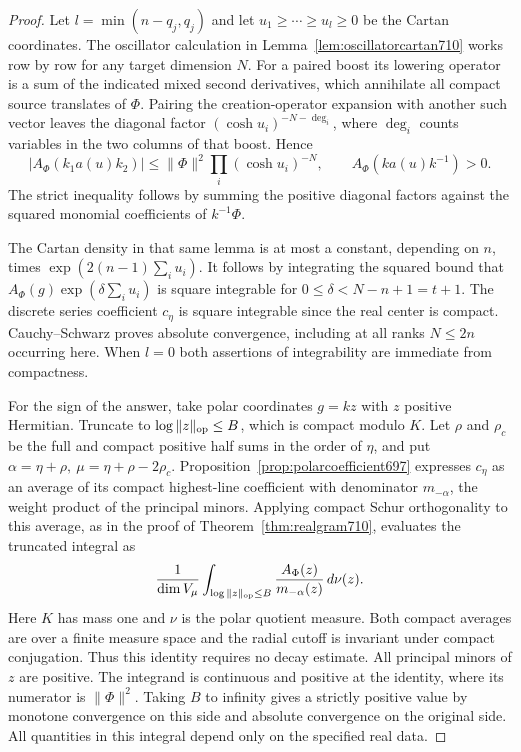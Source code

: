 \documentclass[a4paper,11pt]{article}
\theoremstyle{definition}
\theoremstyle{remark}
\numberwithin{equation}{section}
\begin{document}
\begin{proof}
Let \(l=\min(n-q_j,q_j)\) and let \(u_1\geq\cdots\geq u_l\geq0\)
be the Cartan coordinates. The oscillator calculation in
Lemma~\ref{lem:oscillatorcartan710} works row by row for any
target dimension \(N\). For a paired boost its lowering operator
is a sum of the indicated mixed second derivatives, which
annihilate all compact source translates of \(\Phi\). Pairing the
creation-operator expansion with another such vector leaves the
diagonal factor \((\cosh u_i)^{-N-\deg_i}\), where \(\deg_i\)
counts variables in the two columns of that boost. Hence
\[
 |A_\Phi(k_1a(u)k_2)|\leq \|\Phi\|^2\prod_i(\cosh u_i)^{-N},
 \qquad
 A_\Phi(ka(u)k^{-1})>0 .
\]
The strict inequality follows by summing the positive diagonal
factors against the squared monomial coefficients of \(k^{-1}\Phi\).

The Cartan density in that same lemma is at most a constant,
depending on \(n\), times \(\exp(2(n-1)\sum_i u_i)\).
It follows by integrating the squared bound that
\(A_\Phi(g)\exp(\delta\sum_i u_i)\) is square integrable for
\(0\leq\delta<N-n+1=t+1\). The discrete series coefficient
\(c_\eta\) is square integrable since the real center is compact.
Cauchy--Schwarz proves absolute convergence, including at all
ranks \(N\leq 2n\) occurring here. When \(l=0\) both assertions
of integrability are immediate from compactness.

For the sign of the answer, take polar coordinates \(g=kz\)
with \(z\) positive Hermitian. Truncate to
\(\log\|z\|_{\rm op}\leq B\), which is compact modulo \(K\).
Let \(\rho\) and \(\rho_c\) be the full and compact positive
half sums in the order of \(\eta\), and put
\(\alpha=\eta+\rho,\ \mu=\eta+\rho-2\rho_c\).
Proposition~\ref{prop:polarcoefficient697} expresses \(c_\eta\)
as an average of its compact highest-line coefficient with
denominator \(m_{-\alpha}\), the weight product of the principal
minors. Applying compact Schur orthogonality to this average,
as in the proof of Theorem~\ref{thm:realgram710}, evaluates the
truncated integral as
\[
     \frac{1}{\dim V_\mu}
       \int_{\log\|z\|_{\rm op}\leq B}
                    \frac{A_\Phi(z)}{m_{-\alpha}(z)}\,d\nu(z).
\]
Here \(K\) has mass one and \(\nu\) is the polar quotient measure.
Both compact averages are over a finite measure space and the
radial cutoff is invariant under compact conjugation. Thus this
identity requires no decay estimate. All principal minors of
\(z\) are positive. The integrand is continuous and positive at
the identity, where its numerator is \(\|\Phi\|^2\).
Taking \(B\) to infinity gives a strictly positive value by
monotone convergence on this side and absolute convergence on
the original side. All quantities in this integral depend only
on the specified real data.
\end{proof}
\end{document}
